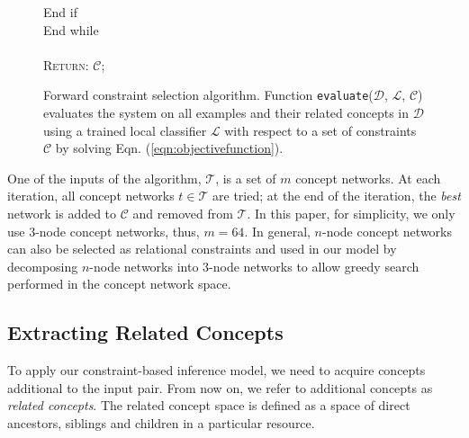 {\begin{figure}[!t]
\begin{centering}
{{\begin{minipage}{6in}
\begin{tabbing}
            \qquad \qquad End if \\
            \qquad End while \\
            \\
            \qquad \textsc{Return}: $\mathcal{C}$; \\
          \end{tabbing}
        \end{minipage}
      }
    }
  \end{centering}
  \caption{
    \label{alg:forwardselection}
    Forward constraint selection algorithm. Function
    \texttt{evaluate}($\mathcal{D}$, $\mathcal{L}$, $\mathcal{C}$)
    evaluates the system on all examples and their related concepts in
    $\mathcal{D}$ using a trained local classifier $\mathcal{L}$ with
    respect to a set of constraints $\mathcal{C}$ by solving
    Eqn. (\ref{eqn:objectivefunction}).}
\end{figure}

One of the inputs of the algorithm, $\mathcal{T}$, is a set of $m$
concept networks. At each iteration, all concept networks $t \in
\mathcal{T}$ are tried; at the end of the iteration, the {\em
  best} network is added to $\mathcal{C}$ and removed from
$\mathcal{T}$. In this paper, for simplicity, we only use 3-node
concept networks, thus, $m = 64$. In general, $n$-node concept
networks can also be selected as relational constraints and used in
our model by decomposing $n$-node networks into $3$-node
networks to allow greedy search performed in the concept network
space.
}

\subsection{Extracting Related Concepts}
\label{sec:rel-con-ext}

To apply our constraint-based inference model, we need to acquire
concepts additional to the input pair. From now on, we refer to
additional concepts as {\em related concepts}. The related concept
space is defined as a space of direct ancestors, siblings and children
in a particular resource.



